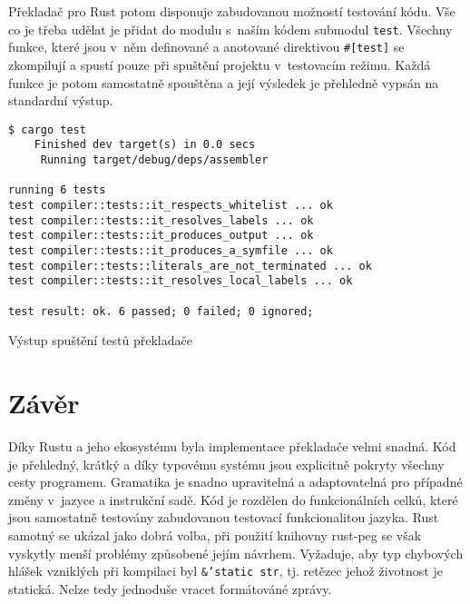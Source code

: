 Překladač pro Rust potom disponuje zabudovanou možností testování kódu. Vše co je třeba udělat je přidat do modulu s~naším kódem submodul \texttt{test}. Všechny funkce, které jsou v~něm definované a anotované direktivou \texttt{#[test]} se zkompilují a spustí pouze při spuštění projektu v~testovacím režimu. Každá funkce je potom samostatně spouštěna a její výsledek je přehledně vypsán na standardní výstup.

\begin{listing}
\begin{verbatim}
$ cargo test
    Finished dev target(s) in 0.0 secs
     Running target/debug/deps/assembler

running 6 tests
test compiler::tests::it_respects_whitelist ... ok
test compiler::tests::it_resolves_labels ... ok
test compiler::tests::it_produces_output ... ok
test compiler::tests::it_produces_a_symfile ... ok
test compiler::tests::literals_are_not_terminated ... ok
test compiler::tests::it_resolves_local_labels ... ok

test result: ok. 6 passed; 0 failed; 0 ignored;
\end{verbatim}
\caption{Výstup spuštění testů překladače}
\label{fig:rust-test}
\end{listing}

\section{Závěr}

Díky Rustu a jeho ekosystému byla implementace překladače velmi snadná. Kód je přehledný, krátký a díky typovému systému jsou explicitně pokryty všechny cesty programem. Gramatika je snadno upravitelná a adaptovatelná pro případné změny v~jazyce a instrukční sadě. Kód je rozdělen do funkcionálních celků, které jsou samostatně testovány zabudovanou testovací funkcionalitou jazyka. Rust samotný se ukázal jako dobrá volba, při použití knihovny rust-peg se však vyskytly menší problémy způsobené jejím návrhem. Vyžaduje, aby typ chybových hlášek vzniklých při kompilaci byl \texttt{&'static str}, tj. retězec jehož životnost je statická. Nelze tedy jednoduše vracet formátováné zprávy.
